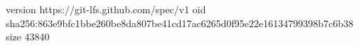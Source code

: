 version https://git-lfs.github.com/spec/v1
oid sha256:863e9bfc1bbe260be8da807be41cd17ac6265d0f95e22e16134799398b7c6b38
size 43840
